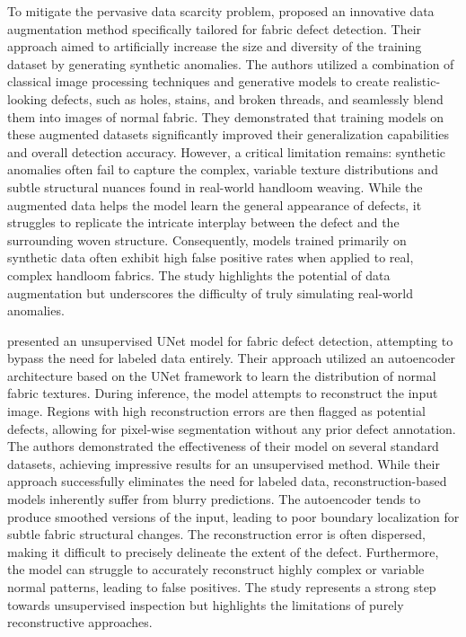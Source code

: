 \documentclass{ieeeaccess}
\begin{document}
To mitigate the pervasive data scarcity problem, \cite{b11} proposed an innovative data augmentation method specifically tailored for fabric defect detection. Their approach aimed to artificially increase the size and diversity of the training dataset by generating synthetic anomalies. The authors utilized a combination of classical image processing techniques and generative models to create realistic-looking defects, such as holes, stains, and broken threads, and seamlessly blend them into images of normal fabric. They demonstrated that training models on these augmented datasets significantly improved their generalization capabilities and overall detection accuracy. However, a critical limitation remains: synthetic anomalies often fail to capture the complex, variable texture distributions and subtle structural nuances found in real-world handloom weaving. While the augmented data helps the model learn the general appearance of defects, it struggles to replicate the intricate interplay between the defect and the surrounding woven structure. Consequently, models trained primarily on synthetic data often exhibit high false positive rates when applied to real, complex handloom fabrics. The study highlights the potential of data augmentation but underscores the difficulty of truly simulating real-world anomalies.

\cite{b12} presented an unsupervised UNet model for fabric defect detection, attempting to bypass the need for labeled data entirely. Their approach utilized an autoencoder architecture based on the UNet framework to learn the distribution of normal fabric textures. During inference, the model attempts to reconstruct the input image. Regions with high reconstruction errors are then flagged as potential defects, allowing for pixel-wise segmentation without any prior defect annotation. The authors demonstrated the effectiveness of their model on several standard datasets, achieving impressive results for an unsupervised method. While their approach successfully eliminates the need for labeled data, reconstruction-based models inherently suffer from blurry predictions. The autoencoder tends to produce smoothed versions of the input, leading to poor boundary localization for subtle fabric structural changes. The reconstruction error is often dispersed, making it difficult to precisely delineate the extent of the defect. Furthermore, the model can struggle to accurately reconstruct highly complex or variable normal patterns, leading to false positives. The study represents a strong step towards unsupervised inspection but highlights the limitations of purely reconstructive approaches.
\end{document}
